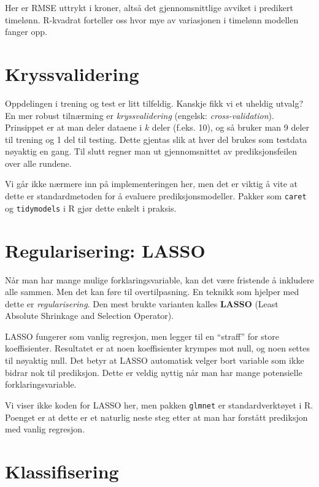 \documentclass[
  norsk,
  letterpaper,
  DIV=11,
  numbers=noendperiod]{scrreprt}
\theoremstyle{definition}
\theoremstyle{remark}
\begin{document}
Her er RMSE uttrykt i kroner, altså det gjennomsnittlige avviket i
predikert timelønn. R-kvadrat forteller oss hvor mye av variasjonen i
timelønn modellen fanger opp.

\section{Kryssvalidering}\label{kryssvalidering}

Oppdelingen i trening og test er litt tilfeldig. Kanskje fikk vi et
uheldig utvalg? En mer robust tilnærming er \emph{kryssvalidering}
(engelsk: \emph{cross-validation}). Prinsippet er at man deler dataene i
\(k\) deler (f.eks. 10), og så bruker man 9 deler til trening og 1 del
til testing. Dette gjentas slik at hver del brukes som testdata nøyaktig
en gang. Til slutt regner man ut gjennomsnittet av prediksjonsfeilen
over alle rundene.

Vi går ikke nærmere inn på implementeringen her, men det er viktig å
vite at dette er standardmetoden for å evaluere prediksjonsmodeller.
Pakker som \texttt{caret} og \texttt{tidymodels} i R gjør dette enkelt i
praksis.

\section{Regularisering: LASSO}\label{regularisering-lasso}

Når man har mange mulige forklaringsvariable, kan det være fristende å
inkludere alle sammen. Men det kan føre til overtilpasning. En teknikk
som hjelper med dette er \emph{regularisering}. Den mest brukte
varianten kalles \textbf{LASSO} (Least Absolute Shrinkage and Selection
Operator).

LASSO fungerer som vanlig regresjon, men legger til en ``straff'' for
store koeffisienter. Resultatet er at noen koeffisienter krympes mot
null, og noen settes til nøyaktig null. Det betyr at LASSO automatisk
velger bort variable som ikke bidrar nok til prediksjon. Dette er veldig
nyttig når man har mange potensielle forklaringsvariable.

Vi viser ikke koden for LASSO her, men pakken \texttt{glmnet} er
standardverktøyet i R. Poenget er at dette er et naturlig neste steg
etter at man har forstått prediksjon med vanlig regresjon.

\section{Klassifisering}\label{klassifisering}
\end{document}
